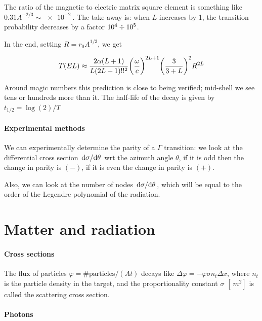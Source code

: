 \documentclass[main.tex]{subfiles}
\begin{document}
The ratio of the magnetic to electric matrix square element is something like \(0.31A^{-2/3} \sim \SI{e-2}{} \). The take-away is: when \(L\) increases by 1, the transition probability decreases by a factor \(\SI{e4}{} \divisionsymbol \SI{e5}{} \).

In the end, setting \(R = r_0 A^{1/3}\), we get

\begin{equation}
    T(E L ) \approx
    \frac{2 \alpha (L+1)}{L (2L+1)!!^2} \qty(\frac{\omega}{c})^{2L+1} \qty(\frac{3}{3+L})^2 R^{2L}
\end{equation}

Around magic numbers this prediction is close to being verified; mid-shell we see tens or hundreds more than it. The half-life of the decay is given by \(t_{1/2} = \log(2)/T  \)

\paragraph{Experimental methods}

We can experimentally determine the parity of a \(\Gamma\) transition: we look at the differential cross section \(\dv*{\sigma}{\theta} \) wrt the azimuth angle \(\theta\), if it is odd then the change in parity is \((-)\), if it is even the change in parity is \((+)\).

Also, we can look at the number of nodes \(\dv*{\sigma}{\theta} \), which will be equal to the order of the Legendre polynomial of the radiation.

\section{Matter and radiation}

\paragraph{Cross sections}

The flux of particles \(\varphi = \# \text{particles} / (A t)\) decays like \(\Delta \varphi = - \varphi \sigma n_t \Delta x\), where \(n_t\) is the particle density in the target, and the proportionality constant \(\sigma\) \([\SI{}{m^2} ]\) is called the scattering cross section.

\paragraph{Photons}
\end{document}
